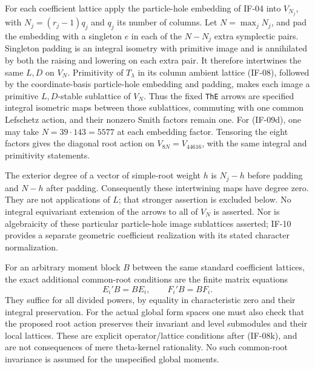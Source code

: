 \documentclass[11pt,a4paper]{article}
\theoremstyle{definition}
\theoremstyle{remark}
\begin{document}
For each coefficient lattice apply the particle-hole embedding of IF-04
into $V_{N_j}$, with $N_j=(r_j-1)q_j$ and $q_j$ its number of columns.
Let $N=\max_jN_j$, and pad the embedding with a singleton $e$ in each
of the $N-N_j$ extra symplectic pairs. Singleton padding is an integral
isometry with primitive image and is annihilated by both the raising
and lowering on each extra pair. It therefore intertwines the same
$L,D$ on $V_N$. Primitivity of $T_\lambda$ in its column ambient lattice
(IF-08), followed by the coordinate-basis particle-hole embedding and
padding, makes each image a primitive $L,D$-stable sublattice of $V_N$.
Thus the fixed \texttt{ThE} arrows are specified integral isometric maps
between those sublattices, commuting with one common Lefschetz action,
and their nonzero Smith factors remain one. For (IF-09d), one may take
$N=39\cdot143=5577$ at each embedding factor. Tensoring the eight
factors gives the diagonal root action on $V_{8N}=V_{44616}$, with
the same integral and primitivity statements.

The exterior degree of a vector of simple-root weight $h$ is
$N_j-h$ before padding and $N-h$ after padding. Consequently these
intertwining maps have degree zero. They are not applications of $L$;
that stronger assertion is excluded below. No integral equivariant
extension of the arrows to all of $V_N$ is asserted. Nor is algebraicity
of these particular particle-hole image sublattices asserted; IF-10
provides a separate geometric coefficient realization with its stated
character normalization.

For an arbitrary moment block $B$ between the same standard coefficient
lattices, the exact additional common-root conditions are the finite
matrix equations
\[
 E_i' B=B E_i,\qquad F_i' B=B F_i.                 \tag{IF-09f}
\]
They suffice for all divided powers, by equality in characteristic zero
and their integral preservation. For the actual global form spaces one
must also check that the proposed root action preserves their invariant
and level submodules and their local lattices. These are explicit
operator/lattice conditions after (IF-08k), and are not consequences of
mere theta-kernel rationality. No such common-root invariance is assumed
for the unspecified global moments.
\end{document}
